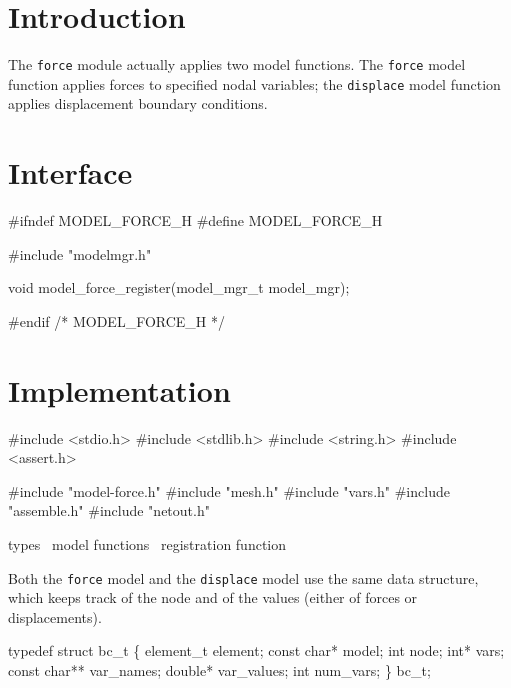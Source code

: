 
\section{Introduction}

The {\tt{}force} module actually applies two model functions.
The {\tt{}force} model function applies forces to specified
nodal variables; the {\tt{}displace} model function applies
displacement boundary conditions.


\section{Interface}

\endmoddef
#ifndef MODEL_FORCE_H
#define MODEL_FORCE_H

#include "modelmgr.h"

void model_force_register(model_mgr_t model_mgr);

#endif /* MODEL_FORCE_H */
\nwendcode{}\nwdocspar


\section{Implementation}

\nwenddocs{}\endmoddef
#include <stdio.h>
#include <stdlib.h>
#include <string.h>
#include <assert.h>

#include "model-force.h"
#include "mesh.h"
#include "vars.h"
#include "assemble.h"
#include "netout.h"

\LA{}types~{\nwtagstyle{}}\RA{}
\LA{}model functions~{\nwtagstyle{}}\RA{}
\LA{}registration function~{\nwtagstyle{}}\RA{}
\nwendcode{}\nwdocspar

Both the {\tt{}force} model and the {\tt{}displace} model use the same
data structure, which keeps track of the node and of the
values (either of forces or displacements).

\nwenddocs{}\endmoddef
typedef struct bc_t \{
    element_t     element;
    const char*   model;
    int           node;
    int*          vars;
    const char**  var_names;
    double*       var_values;
    int           num_vars;
\} bc_t;

